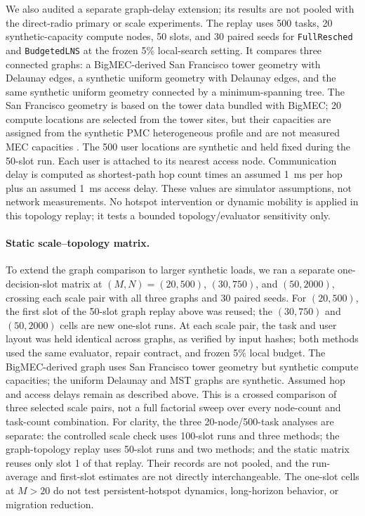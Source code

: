 \documentclass[preprint,12pt]{elsarticle}
\begin{document}
We also audited a separate graph-delay extension; its results are not pooled
with the direct-radio primary or scale experiments. The replay uses 500 tasks,
20 synthetic-capacity compute nodes, 50 slots, and 30 paired seeds for
\texttt{FullResched} and \texttt{BudgetedLNS} at the frozen 5\% local-search
setting. It compares three connected graphs: a BigMEC-derived San Francisco
tower geometry with Delaunay edges, a synthetic uniform geometry with
Delaunay edges, and the same synthetic uniform geometry connected by a
minimum-spanning tree. The San Francisco geometry is based on the tower data
bundled with BigMEC; 20 compute locations are selected from the tower sites,
but their capacities are assigned from the synthetic PMC heterogeneous
profile and are not measured MEC capacities \citep{brandherm2022bigmec,brandherm2024bigmecsoftware}.
The 500 user locations are synthetic and held fixed during the 50-slot run.
Each user is attached to its nearest access node. Communication delay is
computed as shortest-path hop count times an assumed 1~ms per hop plus an
assumed 1~ms access delay. These values are simulator assumptions, not network
measurements. No hotspot intervention or dynamic mobility is applied in this
topology replay; it tests a bounded topology/evaluator sensitivity only.

\paragraph{Static scale--topology matrix.} To extend the graph comparison to larger
synthetic loads, we ran a separate one-decision-slot matrix at
$(M,N)=(20,500)$, $(30,750)$, and $(50,2000)$, crossing each scale pair with
all three graphs and 30 paired seeds. For $(20,500)$, the first slot of the
50-slot graph replay above was reused; the $(30,750)$ and $(50,2000)$ cells
are new one-slot runs. At each scale pair, the task and user layout was held
identical across graphs, as verified by input hashes; both methods used the
same evaluator, repair contract, and frozen 5\% local budget. The BigMEC-derived
graph uses San Francisco tower geometry but synthetic compute capacities;
the uniform Delaunay and MST graphs are synthetic. Assumed hop and access
delays remain as described above. This is a crossed comparison of three
selected scale pairs, not a full factorial sweep over every node-count and
task-count combination. For clarity, the three 20-node/500-task analyses are
separate: the controlled scale check uses 100-slot runs and three methods; the
graph-topology replay uses 50-slot runs and two methods; and the static matrix
reuses only slot 1 of that replay. Their records are not pooled, and the
run-average and first-slot estimates are not directly interchangeable. The
one-slot cells at $M>20$ do not test persistent-hotspot dynamics, long-horizon
behavior, or migration reduction.
\end{document}
